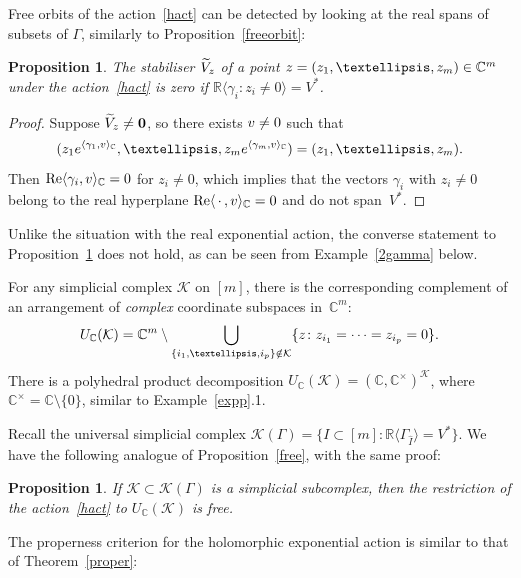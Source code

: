 \documentclass[a4paper]{amsart}
\newtheorem{proposition}[theorem]{Proposition}
\theoremstyle{definition}
\theoremstyle{remark}
\numberwithin{equation}{section}
\def\R{\mathbb R}
\def\C{\mathbb C}
\def\R{\mathbb R}
\def\sK{\mathcal K}
\newcommand{\mb}[1]{{\textbf {\textit#1}}}
\def\Re{\mathop{\mathrm{Re}}}
\newcommand{\<}{\langle}
\renewcommand{\>}{\rangle}
\begin{document}
Free orbits of the action~\eqref{hact} can be detected by looking at the real spans of subsets of $\Gamma$, similarly to Proposition~\ref{freeorbit}:

\begin{proposition}\label{Cfreeorbit}
The stabiliser $\widetilde V_{\mb z}$ of a point $\mb z=(z_1,\ldots,z_m)\in\C^m$ under the action~\eqref{hact} is zero if $\R\langle\gamma_i\colon z_i\ne0\rangle=V^*$.
\end{proposition}
\begin{proof}
Suppose $\widetilde V_{\mb z}\ne\bf0$, so there exists $\mb v\ne0$ such that
\[
  (z_1e^{\langle\gamma_1,\mb
  v\rangle_\C},\ldots,z_me^{\langle\gamma_m,\mb v\rangle_\C})=(z_1,\ldots,z_m).
\]
Then $\Re\langle\gamma_i,\mb v\rangle_\C=0$ for $z_i\ne0$, which implies that the vectors $\gamma_i$ with $z_i\ne0$ belong to the real hyperplane $\Re\langle\,\cdot\,,\mb v\rangle_\C=0$ and do not span~$V^*$.
\end{proof}

Unlike the situation with the real exponential action, the converse statement to Proposition~\ref{Cfreeorbit} does not hold, as can be seen from Example~\eqref{2gamma} below.

For any simplicial complex $\mathcal K$ on $[m]$, there is the corresponding complement of an arrangement of \emph{complex} coordinate subspaces 
in~$\C^m$:
\begin{equation}\label{UKC}
  U_\C(\mathcal K)=\C^m\setminus\bigcup_{\{i_1,\ldots,i_p\}\notin\mathcal K}
  \{\mb z\colon z_{i_1}=\cdots=z_{i_p}=0\}.
\end{equation}
There is a polyhedral product decomposition $U_\C(\sK)=(\C,\C^\times)^\sK$, where $\C^\times=\C\setminus\{0\}$, similar to Example~\ref{expp}.1. 


Recall the universal simplicial complex $\mathcal K(\Gamma)=\{I\subset[m]\colon \R\langle\Gamma_{\widehat I}\rangle=V^*\}$. We have the following analogue of Proposition~\ref{free}, with the same proof:

\begin{proposition}\label{Cfree}
If $\sK\subset\sK(\Gamma)$ is a simplicial subcomplex, then the restriction of the action~\eqref{hact} to $U_\C(\sK)$ is free.
\end{proposition}

The properness criterion for the holomorphic exponential action is similar to that of Theorem~\ref{proper}:
\end{document}
